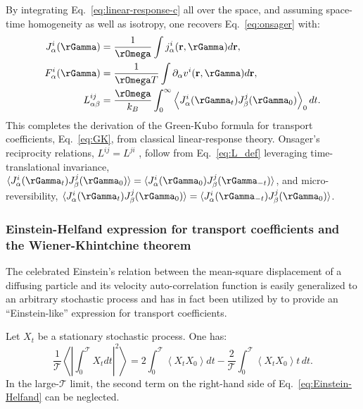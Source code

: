 By integrating Eq.~\eqref{eq:linear-response-c} all over the space, and assuming space-time homogeneity as well as isotropy, one recovers Eq.~\eqref{eq:onsager} with:
\begin{align}
J^i_\alpha(\rGamma) &= \frac{1}{\rOmega} \int j^i_\alpha(\mathbf{r},\rGamma) d\mathbf{r}, \label{eq:J_def}\\
F^i_\alpha(\rGamma) &= \frac{1}{\rOmega T} \int \partial_\alpha v^i(\mathbf{r},\rGamma) d\mathbf{r}, \label{eq:F_def}\\
L^{ij}_{\alpha\beta} &= \frac{\rOmega}{k_B} \int_0^\infty \left\langle J^i_\alpha(\rGamma_t) J^j_\beta(\rGamma_0)\right\rangle_0 dt. \label{eq:L_def}
\end{align}
This completes the derivation of the Green-Kubo formula for transport coefficients, Eq.~\eqref{eq:GK}, from classical linear-response theory. Onsager's reciprocity relations, $L^{ij}=L^{ji}$ \citep{Onsager1931a,Onsager1931b}, follow from Eq.~\eqref{eq:L_def} leveraging time-translational invariance, $\langle J^i_\alpha(\rGamma_t) J^j_\beta(\rGamma_0) \rangle = \langle J^i_\alpha(\rGamma_0) J^j_\beta(\rGamma_{-t}) \rangle$, and micro-reversibility, $\langle J^i_\alpha(\rGamma_t) J^j_\beta(\rGamma_0) \rangle = \langle J^i_\alpha(\rGamma_{-t}) J^j_\beta(\rGamma_0) \rangle$.


\subsubsection{Einstein-Helfand expression for transport coefficients and the Wiener-Khintchine theorem}  \label{sec:Einstein}
The celebrated Einstein's relation between the mean-square displacement of a diffusing particle and its velocity auto-correlation function is easily generalized to an arbitrary stochastic process and has in fact been utilized by \cite{Helfand1960} to provide an ``Einstein-like'' expression for transport coefficients.

Let $X_t$ be a stationary stochastic process. One has:
\begin{equation}
  \frac{1}{\mathcal{T}} \left \langle \left | \int_0^\mathcal{T} X_t dt \right |^2 \right \rangle = 2 \int_0^\mathcal{T} \left \langle X_t X_0 \right \rangle dt -\frac{2}{\mathcal{T}} \int_0^\mathcal{T} \left \langle X_t X_0 \right \rangle t \,dt. \label{eq:Einstein-Helfand}
\end{equation}
In the large-$\mathcal{T}$ limit, the second term on the right-hand side of Eq.~\eqref{eq:Einstein-Helfand} can be neglected.

